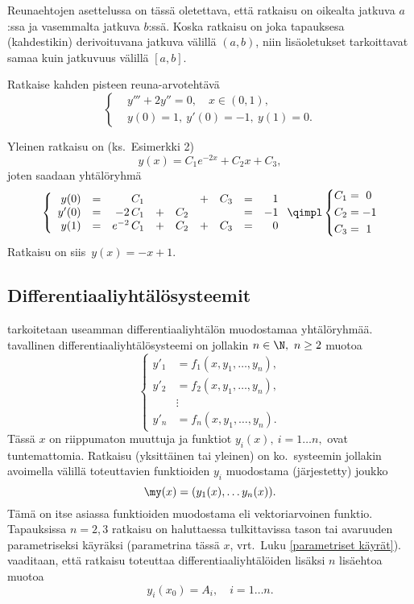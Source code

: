 Reunaehtojen asettelussa on tässä oletettava, että ratkaisu on oikealta jatkuva $a$:ssa ja
vasemmalta jatkuva $b$:ssä. Koska ratkaisu on joka tapauksesa (kahdestikin) derivoituvana
jatkuva välillä $(a,b)$, niin lisäoletukset tarkoittavat samaa kuin jatkuvuus välillä $[a,b]$.
\begin{Exa}
Ratkaise kahden pisteen reuna-arvotehtävä
\[
\left\{ \begin{aligned}
&y'''+2y''=0,\quad x\in (0,1), \\
&y(0)=1, \ y'(0)=-1, \ y(1)=0.
\end{aligned} \right.
\]
\end{Exa}
\ratk Yleinen ratkaisu on (ks.\ Esimerkki 2)
\[
y(x)=C_1e^{-2x}+C_2x+C_3,
\]
joten saadaan yhtälöryhmä
\[ \left\{ \begin{array}{rrrrrrrrr}  y(0)&=&        C_1& &   &+&C_3&=& 1 \\
                                    y'(0)&=&    -2\,C_1&+&C_2& &   &=&-1 \\
                                     y(1)&=&e^{-2}\,C_1&+&C_2&+&C_3&=& 0
\end{array} \right. 
   \qimpl \left\{ \begin{aligned} C_1&=\ 0 \\ C_2&=-1 \\ C_3&=\ 1 \end{aligned} \right. \] 
Ratkaisu on siis $\,y(x)=-x+1$. \loppu 

\subsection{Differentiaaliyhtälösysteemit}

 tarkoitetaan useamman differentiaaliyhtälön muodostamaa
yhtälöryhmää. 
 tavallinen differentiaaliyhtälösysteemi on jollakin
$n\in\N,\ n \ge 2$ muotoa
\[
 \left\{ \begin{aligned} 
         y'_1 &= f_1(x,y_1, \ldots, y_n), \\
         y'_2 &= f_2(x,y_1, \ldots, y_n), \\
              &\vdots \\
         y'_n &= f_n(x,y_1, \ldots, y_n).
         \end{aligned} \right.
\]
Tässä $x$ on riippumaton muuttuja ja funktiot $y_i(x),\ i=1 \ldots n,$ ovat tuntemattomia.
Ratkaisu (yksittäinen tai yleinen) on ko.\ systeemin jollakin avoimella välillä toteuttavien
funktioiden $y_i$ muodostama (järjestetty) joukko
\[
\my(x)=(y_1(x), \ldots y_n(x)).
\]
Tämä on itse asiassa funktioiden muodostama  eli vektoriarvoinen funktio.
Tapauksissa $n=2,3$ ratkaisu on haluttaessa tulkittavissa tason tai avaruuden parametriseksi 
käyräksi (parametrina tässä $x$, vrt.\ Luku \ref{parametriset käyrät}).
%
 vaaditaan, että ratkaisu toteuttaa differentiaaliyhtälöiden lisäksi
$n$ lisäehtoa muotoa
\[ 
y_i(x_0) = A_i, \quad i = 1 \ldots n.
\]

